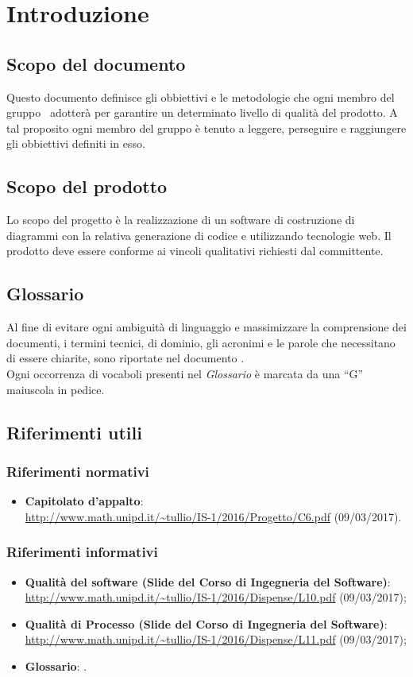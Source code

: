 \documentclass[../PianoDiQualifica.tex]{subfiles}
\begin{document}
	\section{Introduzione}
		\subsection{Scopo del documento}
			Questo documento definisce gli obbiettivi e le metodologie che ogni membro del gruppo
			\kaleidoscode\ adotterà per garantire un determinato livello di qualità del prodotto.
			A tal proposito ogni membro del gruppo è tenuto a leggere, perseguire e raggiungere gli obbiettivi definiti in esso.
		\subsection{Scopo del prodotto}
			Lo scopo del progetto è la realizzazione di un software di
			costruzione di diagrammi  con la relativa generazione
			di codice  e  utilizzando tecnologie
			web. Il prodotto deve essere conforme ai vincoli qualitativi richiesti dal committente.
		\subsection{Glossario}
			Al fine di evitare ogni ambiguità di linguaggio e massimizzare la
			comprensione dei documenti, i termini tecnici, di dominio, gli
			acronimi e le parole che necessitano di essere chiarite, sono
			riportate nel documento \glossariov.\\
			Ogni occorrenza di vocaboli presenti nel \textit{Glossario} è
			marcata da una ``G'' maiuscola in pedice.
		\subsection{Riferimenti utili}
			\subsubsection{Riferimenti normativi}
    			\begin{itemize}
    				\item \textbf{Capitolato d'appalto}:\\
    				\url{http://www.math.unipd.it/~tullio/IS-1/2016/Progetto/C6.pdf} (09/03/2017).
				\end{itemize}
			\subsubsection{Riferimenti informativi}	
				\begin{itemize}
					\item \textbf{Qualità del software (Slide del Corso di Ingegneria del Software)}:\\
					\url{http://www.math.unipd.it/~tullio/IS-1/2016/Dispense/L10.pdf} (09/03/2017);
					\item \textbf{Qualità di Processo (Slide del Corso di Ingegneria del Software)}:\\
					\url{http://www.math.unipd.it/~tullio/IS-1/2016/Dispense/L11.pdf} (09/03/2017);
					\item \textbf{Glossario}: \glossariov.
				\end{itemize}
\end{document}
